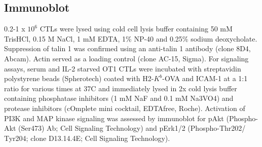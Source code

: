 \subsection{Immunoblot}
0.2-1 x $10^{6}$ CTLs were lysed using cold cell lysis buffer containing 50 mM TrisHCl, 0.15 M NaCl, 1 mM EDTA, 1\% NP-40 and 0.25\% sodium deoxycholate. Suppression of talin 1 was confirmed using an anti-talin 1 antibody (clone 8D4, Abcam). Actin served as a loading control (clone AC-15, Sigma). For signaling assays, serum and IL-2 starved OT1 CTLs were incubated with streptavidin polystyrene beads (Spherotech) coated with H2-$K^{b}$-OVA and ICAM-1 at a 1:1 ratio for various times at 37\degree C and immediately lysed in 2x cold lysis buffer containing phosphatase inhibitors (1 mM NaF and 0.1 mM Na3VO4) and protease inhibitors (cOmplete mini cocktail, EDTAfree, Roche). Activation of PI3K and MAP kinase signaling was assessed by immunoblot for pAkt (Phospho-Akt (Ser473) Ab; Cell Signaling Technology) and pErk1/2 (Phospho-Thr202/ Tyr204; clone D13.14.4E; Cell Signaling Technology).
